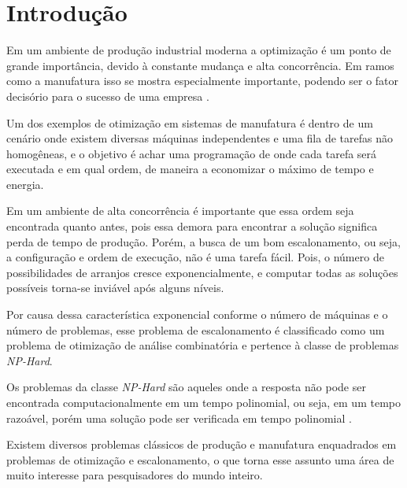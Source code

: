 \chapter{Introdução}
    Em um ambiente de produção industrial moderna a optimização é um ponto de grande importância, devido à constante mudança e alta concorrência. Em ramos como a manufatura isso se mostra especialmente importante, podendo ser o fator decisório para o sucesso de uma empresa \cite{Wari2016}.\hfill\vspace{\onelineskip}
    
    Um dos exemplos de otimização em sistemas de manufatura é dentro de um cenário onde existem diversas máquinas independentes e uma fila de tarefas não homogêneas, e o objetivo é achar uma programação de onde cada tarefa será executada e em qual ordem, de maneira a economizar o máximo de tempo e energia.\hfill\vspace{\onelineskip}

    Em um ambiente de alta concorrência é importante que essa ordem seja encontrada quanto antes, pois essa demora para encontrar a solução significa perda de tempo de produção. Porém, a busca de um bom escalonamento, ou seja, a configuração e ordem de execução, não é uma tarefa fácil. Pois, o número de possibilidades de arranjos cresce exponencialmente, e computar todas as soluções possíveis torna-se inviável após alguns níveis.\hfill\vspace{\onelineskip}

    Por causa dessa característica exponencial conforme o número de máquinas e o número de problemas, esse problema de escalonamento é classificado como um problema de otimização de análise combinatória e pertence à classe de problemas \textit{NP-Hard}.\hfill\vspace{\onelineskip}

    Os problemas da classe \textit{NP-Hard} são aqueles onde a resposta não pode ser encontrada computacionalmente em um tempo polinomial, ou seja, em um tempo razoável, porém uma solução pode ser verificada em tempo polinomial \cite{Eswaramurthy2008}.\hfill\vspace{\onelineskip}

    Existem diversos problemas clássicos de produção e manufatura enquadrados em problemas de otimização e escalonamento, o que torna esse assunto uma área de muito interesse para pesquisadores do mundo inteiro.\hfill\vspace{\onelineskip}

